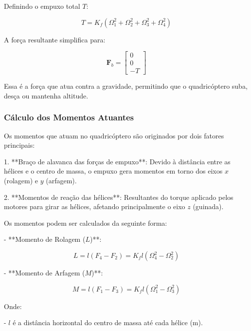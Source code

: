 Definindo o empuxo total \( T \):

\begin{equation}
T = K_f (\Omega_1^2 + \Omega_2^2 + \Omega_3^2 + \Omega_4^2)
\label{eq:empuxo_total}
\end{equation}

A força resultante simplifica para:

\begin{equation}
\mathbf{F}_b = \begin{bmatrix}
0 \\
0 \\
- T
\end{bmatrix}
\label{eq:forca_resultante_simplificada}
\end{equation}

Essa é a força que atua contra a gravidade, permitindo que o quadricóptero suba, desça ou mantenha altitude.

\subsubsection{Cálculo dos Momentos Atuantes}

Os momentos que atuam no quadricóptero são originados por dois fatores principais:

1. **Braço de alavanca das forças de empuxo**: Devido à distância entre as hélices e o centro de massa, o empuxo gera momentos em torno dos eixos \( x \) (rolagem) e \( y \) (arfagem).

2. **Momentos de reação das hélices**: Resultantes do torque aplicado pelos motores para girar as hélices, afetando principalmente o eixo \( z \) (guinada).

Os momentos podem ser calculados da seguinte forma:

- **Momento de Rolagem (\( L \))**:

\begin{equation}
L = l (F_4 - F_2) = K_f l (\Omega_4^2 - \Omega_2^2)
\label{eq:momento_rolagem}
\end{equation}

- **Momento de Arfagem (\( M \))**:

\begin{equation}
M = l (F_1 - F_3) = K_f l (\Omega_1^2 - \Omega_3^2)
\label{eq:momento_arfagem}
\end{equation}

Onde:

- \( l \) é a distância horizontal do centro de massa até cada hélice (m).

